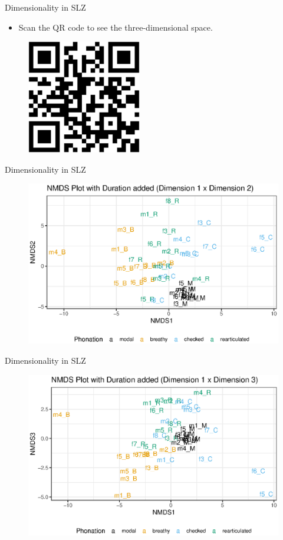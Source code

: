 \documentclass{beamer}
\begin{document}
\begin{frame}{Dimensionality in SLZ}
  \begin{itemize}
    \item Scan the QR code to see the three-dimensional space.
  \end{itemize}
  \begin{figure}[h!]
    \centering
    \includegraphics[width=5cm, scale=0.5]{qrcode_3d_plot.eps}
  \end{figure}
\end{frame}

\begin{frame}{Dimensionality in SLZ}
  \begin{figure}
    \centering
    \includegraphics[width = 0.8\linewidth]{images/MDS/nmds12_dur.eps}
  \end{figure}
\end{frame}

\begin{frame}{Dimensionality in SLZ}
  \begin{figure}
    \centering
    \includegraphics[width = 0.8\linewidth]{images/MDS/nmds13_dur.eps}
  \end{figure}
\end{frame}
\end{document}
